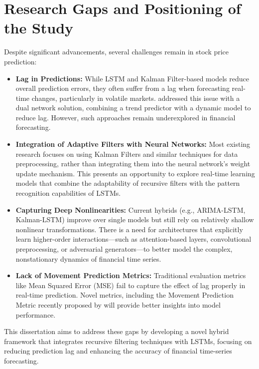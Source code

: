 \section{Research Gaps and Positioning of the Study}
Despite significant advancements, several challenges remain in stock price prediction:
\begin{itemize}
    \item \textbf{Lag in Predictions:} While LSTM and Kalman Filter-based models reduce overall prediction errors, they often suffer from a lag when forecasting real-time changes, particularly in volatile markets. \textcite{samanta_dual_2020} addressed this issue with a dual network solution, combining a trend predictor with a dynamic model to reduce lag. However, such approaches remain underexplored in financial forecasting.
    
    \item \textbf{Integration of Adaptive Filters with Neural Networks:} Most existing research focuses on using Kalman Filters and similar techniques for data preprocessing, rather than integrating them into the neural network's weight update mechanism. This presents an opportunity to explore real-time learning models that combine the adaptability of recursive filters with the pattern recognition capabilities of LSTMs.

    \item \textbf{Capturing Deep Nonlinearities:} Current hybrids (e.g., ARIMA-LSTM, Kalman-LSTM) improve over single models but still rely on relatively shallow nonlinear transformations. There is a need for architectures that explicitly learn higher-order interactions—such as attention-based layers, convolutional preprocessing, or adversarial generators—to better model the complex, nonstationary dynamics of financial time series.

    \item \textbf{Lack of Movement Prediction Metrics:} Traditional evaluation metrics like Mean Squared Error (MSE) fail to capture the effect of lag properly in real-time prediction. Novel metrics, including the Movement Prediction Metric recently proposed by \textcite{samanta_dual_2020} will provide better insights into model performance.
\end{itemize}

This dissertation aims to address these gaps by developing a novel hybrid framework that integrates recursive filtering techniques with LSTMs, focusing on reducing prediction lag and enhancing the accuracy of financial time-series forecasting.